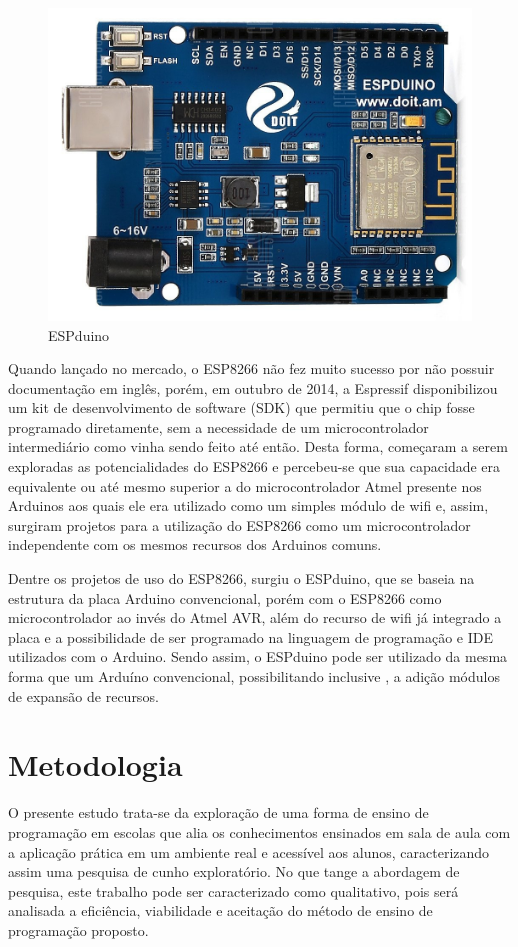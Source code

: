 \documentclass[12pt]{article}
\begin{document}
\begin{figure}[!ht]
\centering
\includegraphics[keepaspectratio, width=0.4
\textwidth]{images/espduino.jpg}
\caption{ESPduino}
\label{fig:arduino}
\end{figure}

	Quando lançado no mercado, o ESP8266 não fez muito sucesso por não possuir documentação em inglês, porém, em outubro de 2014, a Espressif disponibilizou um kit de desenvolvimento de software (SDK) que permitiu que o chip fosse programado diretamente, sem a necessidade de um microcontrolador intermediário como vinha sendo feito até então. Desta forma, começaram a serem exploradas as potencialidades do ESP8266 e percebeu-se que sua capacidade era equivalente ou até mesmo superior a do microcontrolador Atmel presente nos Arduinos aos quais ele era utilizado como um simples módulo de wifi e, assim, surgiram projetos para a utilização do ESP8266 como um microcontrolador independente com os mesmos recursos dos Arduinos comuns.
    
    Dentre os projetos de uso do ESP8266, surgiu o ESPduino, que se baseia na estrutura da placa Arduino convencional, porém com o ESP8266 como microcontrolador ao invés do Atmel AVR, além do recurso de wifi já integrado a placa e a possibilidade de ser programado na linguagem de programação e IDE utilizados com o Arduino. Sendo assim, o ESPduino pode ser utilizado da mesma forma que um Arduíno convencional, possibilitando inclusive , a adição módulos de expansão de recursos.
    
	\section{Metodologia}
	O presente estudo trata-se da exploração de uma forma de ensino de programação em escolas que alia os conhecimentos ensinados em sala de aula com a aplicação prática em um ambiente real e acessível aos alunos, caracterizando assim uma pesquisa de cunho exploratório. No que tange a abordagem de pesquisa, este trabalho pode ser caracterizado como qualitativo, pois será analisada a eficiência, viabilidade e aceitação do método de ensino de programação proposto.
    
\end{document}
